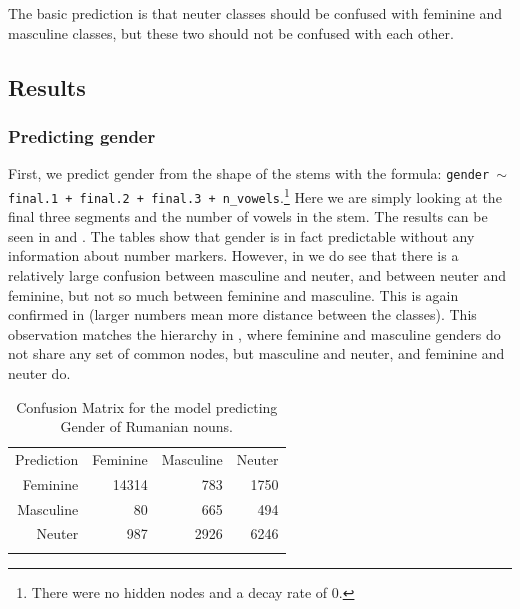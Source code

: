 The basic prediction is that neuter classes should be confused with feminine and masculine classes, but these two should not be confused with each other.

\subsection{Results}

\subsubsection{Predicting gender}

First, we predict gender from the shape of the stems with the formula: \texttt{gender $\sim$ final.1 + final.2 + final.3 + n\_vowels}.\footnote{There were no hidden nodes and a decay rate of 0.} Here we are simply looking at the final three segments and the number of vowels in the stem. The results can be seen in  and . The tables show that gender is in fact predictable without any information about number markers. However, in  we do see that there is a relatively large confusion between masculine and neuter, and between neuter and feminine, but not so much between feminine and masculine. This is again confirmed in  (larger numbers mean more distance between the classes). This observation matches the hierarchy in , where feminine and masculine genders do not share any set of common nodes, but masculine and neuter, and feminine and neuter do.

\begin{table}[!htpb]
  \centering
  \begin{tabular}{rrrr}
    \lsptoprule
    \multicolumn{4}{c}{Reference}              \\
    \midrule
    Prediction & Feminine & Masculine & Neuter \\
    Feminine   & 14314    & 783       & 1750   \\
    Masculine  & 80       & 665       & 494    \\
    Neuter     & 987      & 2926      & 6246   \\
    \lspbottomrule
  \end{tabular}
  \caption{Confusion Matrix for the model predicting Gender of Rumanian nouns.}\label{tab:gender-romanian}
\end{table}


